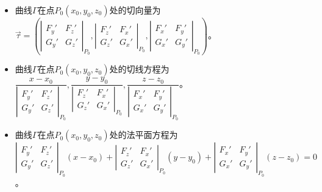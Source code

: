 \documentclass[UTF8, 12pt]{ctexart}
\begin{document}
\begin{itemize}
    \item 曲线$\varGamma$在点$P_0(x_0,y_0,z_0)$处的切向量为\\$\vec{\tau}=\left(\left\vert\begin{array}{cc}
        F_y' & F_z' \\
        G_y' & G_z'
    \end{array}\right\vert_{P_0},\left\vert\begin{array}{ll}
        F_z' & F_x' \\
        G_z' & G_x'
    \end{array}\right\vert_{P_0},\left\vert\begin{array}{ll}
        F_x' & F_y' \\
        G_x' & G_y'
    \end{array}\right\vert_{P_0}\right)$。
    \item 曲线$\varGamma$在点$P_0(x_0,y_0,z_0)$处的切线方程为\\$\dfrac{x-x_0}{\left\vert\begin{array}{cc}
        F_y' & F_z' \\
        G_y' & G_z'
    \end{array}\right\vert_{P_0}},\dfrac{y-y_0}{\left\vert\begin{array}{ll}
        F_z' & F_x' \\
        G_z' & G_x'
    \end{array}\right\vert_{P_0}},\dfrac{z-z_0}{\left\vert\begin{array}{ll}
        F_x' & F_y' \\
        G_x' & G_y'
    \end{array}\right\vert_{P_0}}$。
    \item 曲线$\varGamma$在点$P_0(x_0,y_0,z_0)$处的法平面方程为\\$\left\vert\begin{array}{cc}
        F_y' & F_z' \\
        G_y' & G_z'
    \end{array}\right\vert_{P_0}(x-x_0)+\left\vert\begin{array}{ll}
        F_z' & F_x' \\
        G_z' & G_x'
    \end{array}\right\vert_{P_0}(y-y_0)+\left\vert\begin{array}{ll}
        F_x' & F_y' \\
        G_x' & G_y'
    \end{array}\right\vert_{P_0}(z-z_0)=0$。
\end{itemize}
\end{document}

